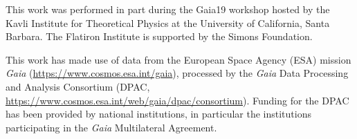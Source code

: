 \documentclass[modern]{aastex63}
\begin{document}


\acknowledgments
This work was performed in part during the Gaia19 workshop hosted by the Kavli Institute for Theoretical Physics at the University of California, Santa Barbara. 
The Flatiron Institute is supported by the Simons Foundation. 

This work has made use of data from the European Space Agency (ESA) mission
{\it Gaia} (\url{https://www.cosmos.esa.int/gaia}), processed by the {\it Gaia}
Data Processing and Analysis Consortium (DPAC,
\url{https://www.cosmos.esa.int/web/gaia/dpac/consortium}). Funding for the DPAC
has been provided by national institutions, in particular the institutions
participating in the {\it Gaia} Multilateral Agreement.




\end{document}
